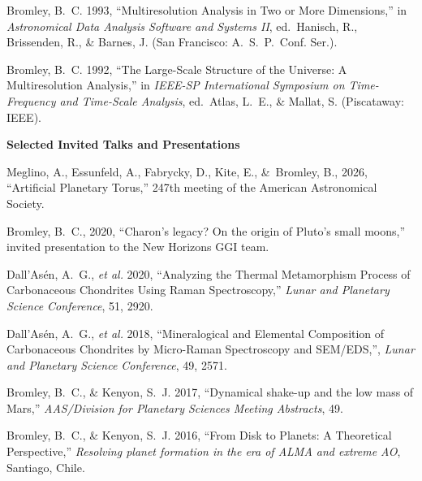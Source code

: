 \documentclass[11pt]{article}
\newcommand{\shead}[1]{\vspace{12.5pt}\centerline{{\bf{#1}}}}
\begin{document}
Bromley, B.\ C. 1993, ``Multiresolution Analysis in Two or More
Dimensions,'' in {\em Astronomical Data Analysis Software and Systems II},
ed.\ Hanisch, R., Brissenden, R., \& Barnes, J.  
(San Francisco: A.\ S.\ P.\ Conf. Ser.).

Bromley, B.\ C.  1992, ``The Large-Scale Structure of the Universe:
A Multiresolution Analysis,'' in {\em IEEE-SP International 
Symposium on Time-Frequency and Time-Scale Analysis},  
ed.\ Atlas, L.\ E., \& Mallat, S. (Piscataway: IEEE).



\shead{Selected Invited Talks and Presentations}
\vspace{11pt}

Meglino, A., Essunfeld, A., Fabrycky, D., Kite, E., \&\ Bromley, B., 2026, ``Artificial Planetary Torus,''
247th meeting of the American Astronomical Society.

Bromley, B.\ C., 2020, ``Charon's legacy? On the origin of Pluto's small moons,'' invited presentation to the New Horizons GGI team.

{Dall'As{\'e}n}, A.~G., \textit{et al.} 2020,
``Analyzing the Thermal Metamorphism Process of Carbonaceous Chondrites Using Raman Spectroscopy,'' \textit{Lunar and Planetary Science Conference}, 51, 2920.




{Dall'As{\'e}n}, A.~G., \textit{et al.}
2018,
``{Mineralogical and Elemental Composition of Carbonaceous Chondrites by Micro-Raman Spectroscopy and SEM/EDS},'', \textit{Lunar and Planetary Science Conference}, 49, 2571.

Bromley, B.\ C., \& Kenyon, S.~J. 2017, ``Dynamical shake-up and the low mass of Mars,'' {\em AAS/Division for Planetary Sciences Meeting Abstracts}, 49.

Bromley, B.\ C., \& Kenyon, S.~J. 2016, ``From Disk to Planets: A
Theoretical Perspective,'' {\em Resolving planet formation in the era
  of ALMA and extreme AO}, Santiago, Chile.
\end{document}
